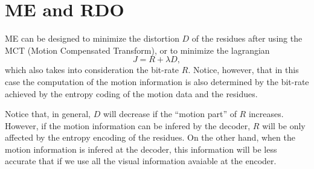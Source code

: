 
\begin{comment}
\begin{figure}
  \centering
  \png{stockholm_hat_P_farneback}{800}
  \caption{The prediction frame (${\hat{\mathbf P}}$). See \href{https://github.com/Sistemas-Multimedia/Sistemas-Multimedia.github.io/blob/master/milestones/09-ME/farneback_ME.ipynb}{this}.}
  \label{fig:hat_P_farneback}
\end{figure}

\begin{figure}
  \centering
  \png{stockholm_error_farneback}{800}
  \caption{The prediction error frame (${\mathbf R} - {\hat{\mathbf P}}$). See \href{https://github.com/Sistemas-Multimedia/Sistemas-Multimedia.github.io/blob/master/milestones/09-ME/farneback_ME.ipynb}{this}.}
  \label{fig:error_farneback}
\end{figure}

\begin{figure}
  \centering
  \png{stockholm_MVs_farneback}{800}
  \caption{Motion vectors to map ${\mathbf P}$ (from which each pixel has been mapped) onto ${\mathbf R}$. See \href{https://github.com/Sistemas-Multimedia/Sistemas-Multimedia.github.io/blob/master/milestones/09-ME/farneback_ME.ipynb}{this}.}
  \label{fig:MVs_farneback}
\end{figure}
\end{comment}



\section{ME and RDO}

ME can be designed to minimize the distortion $D$ of the residues
after using the MCT (Motion Compensated Transform), or to minimize the
lagrangian
\begin{equation}
  J = R + \lambda D,
\end{equation}
which also takes into consideration the bit-rate $R$. Notice, however,
that in this case the computation of the motion information is also
determined by the bit-rate achieved by the entropy coding of the
motion data and the residues.

Notice that, in general, $D$ will decrease if the ``motion part'' of
$R$ increases. However, if the motion information can be infered by
the decoder, $R$ will be only affected by the entropy encoding of the
residues. On the other hand, when the motion information is infered at
the decoder, this information will be less accurate that if we use all
the visual information avaiable at the encoder.

